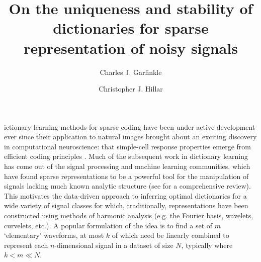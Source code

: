 \documentclass[9pt,twocolumn]{pnas-new}
\title{On the uniqueness and stability of dictionaries for sparse representation of noisy signals}
\author[a,1]{Charles J. Garfinkle}
\author[a,1]{Christopher J. Hillar}
\affil[a]{Redwood Center for Theoretical Neuroscience, Berkeley, CA, USA}
\begin{document}
\verticaladjustment{-2pt}

\maketitle
\thispagestyle{firststyle}

ictionary learning methods for sparse coding have been under active development ever since their application to natural images brought about an exciting discovery in computational neuroscience: that simple-cell response properties emerge from efficient coding principles \cite{Olshausen96, hurri1996image, bell1997independent, van1998independent}. Much of the subsequent work in dictionary learning has come out of the signal processing and machine learning communities, which have found sparse representations to be a powerful tool for the manipulation of signals lacking much known analytic structure (see \cite{Zhang15} for a comprehensive review). This motivates the data-driven approach to inferring optimal dictionaries for a wide variety of signal classes for which, traditionally, representations have been constructed using methods of harmonic analysis (e.g. the Fourier basis, wavelets, curvelets, etc.). A popular formulation of the idea is to find a set of $m$ `elementary' waveforms, at most $k$ of which need be linearly combined to represent each $n$-dimensional signal in a dataset of size $N$, typically where $k < m \ll N$. 
\end{document}

